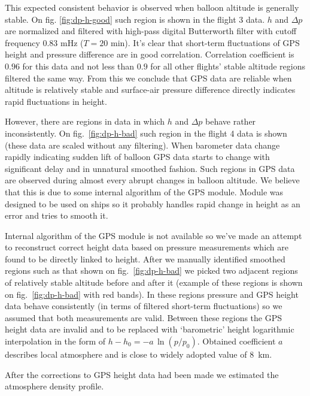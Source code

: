 \documentclass[final,5p,times,twocolumn]{elsarticle}
\begin{document}
This expected consistent behavior is observed when balloon altitude is generally stable. On fig. \ref{fig:dp-h-good} such region is shown in the flight 3 data. $h$ and $\Delta p$ are normalized and filtered with high-pass digital Butterworth filter with cutoff frequency $0.83$ mHz ($T=20$ min). It's clear that short-term fluctuations of GPS height and pressure difference are in good correlation. Correlation coefficient is $0.96$ for this data and not less than $0.9$ for all other flights' stable altitude regions filtered the same way. From this we conclude that GPS data are reliable when altitude is relatively stable and surface-air pressure difference directly indicates rapid fluctuations in height.

However, there are regions in data in which $h$ and $\Delta p$ behave rather inconsistently. On fig.~\ref{fig:dp-h-bad} such region in the flight 4 data is shown (these data are scaled without any filtering). When barometer data change rapidly indicating sudden lift of balloon GPS data starts to change with significant delay and in unnatural smoothed fashion. Such regions in GPS data are observed during almost every abrupt changes in balloon altitude. We believe that this is due to some internal algorithm of the GPS module. Module was designed to be used on ships so it probably handles rapid change in height as an error and tries to smooth it.

Internal algorithm of the GPS module is not available so we've made an attempt to reconstruct correct height data based on pressure measurements which are found to be directly linked to height. After we manually identified smoothed regions such as that shown on fig.~\ref{fig:dp-h-bad} we picked two adjacent regions of relatively stable altitude before and after it (example of these regions is shown on fig.~\ref{fig:dp-h-bad} with red bands). In these regions pressure and GPS height data behave consistently (in terms of filtered short-term fluctuations) so we assumed that both measurements are valid. Between these regions the GPS height data are invalid and to be replaced with `barometric' height logarithmic interpolation in the form of $h-h_0 = - a \, \ln(p/p_0)$. Obtained coefficient $a$ describes local atmosphere and is close to widely adopted value of $8$~km.

After the corrections to GPS height data had been made we estimated the atmosphere density profile. 
\end{document}
